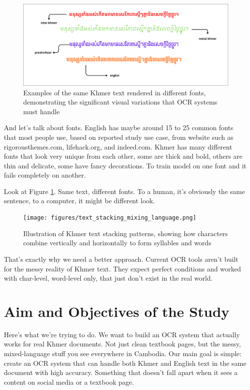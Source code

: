 \begin{figure}[H]
    \centering
    \includegraphics[width=\textwidth]{figures/varianty_of_font.png}
    \caption{Examples of the same Khmer text rendered in different fonts, demonstrating the significant visual variations that OCR systems must handle}
    \label{fig:font_variants}
\end{figure}

And let's talk about fonts. English has maybe around 15 to 25 common fonts that most people use,
based on reported study use case, from website such as rigorousthemes.com, lifehack.org, and indeed.com. 
Khmer has many different fonts that look very unique from each other, some are thick and bold, others are 
thin and delicate, some have fancy decorations. To train model on one font and 
it fails completely on another.

Look at Figure \ref{fig:font_variants}. Same text, different fonts. To a human, 
it's obviously the same sentence, to a computer, it might be different look.

\begin{figure}[H]
    \centering
    \texttt{[image: figures/text\_stacking\_mixing\_language.png]}
    \caption{Illustration of Khmer text stacking patterns, 
    showing how characters combine vertically and horizontally 
    to form syllables and words \citep{buoy2023khmerocr}}
    \label{fig:text_stacking}
\end{figure}

That's exactly why we need a better approach. Current OCR tools aren't 
built for the messy reality of Khmer text. They expect perfect conditions
and worked with char-level, word-level only,
that just don't exist in the real world.

\section{Aim and Objectives of the Study}
\label{sec:objectives}

Here's what we're trying to do. We want to build an OCR system that actually 
works for real Khmer documents. Not just clean textbook pages, but the messy, 
mixed-language stuff you see everywhere in Cambodia. Our main goal is simple: 
create an OCR system that can handle both Khmer and 
English text in the same document with high accuracy. Something that doesn't 
fall apart when it sees a content on social media or a textbook page.

